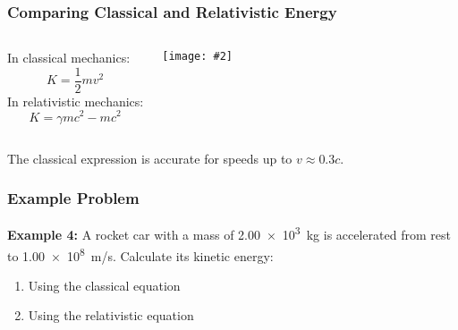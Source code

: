 \documentclass[12pt,compress,aspectratio=169]{beamer}
\newcommand{\pic}[2]{\texttt{[image: \#2]}}
\begin{document}
\begin{frame}
  \frametitle{Comparing Classical and Relativistic Energy}
  \begin{columns}
    In classical mechanics:
    {\Large
      \begin{displaymath}
        K=\frac{1}{2} mv^2
      \end{displaymath}
    }
    In relativistic mechanics:
    {\Large
      \begin{displaymath}
        K=\gamma mc^2-mc^2
      \end{displaymath}
    }
    
    \pic{.85}{graphics/e_k.png}
  \end{columns}

  The classical expression is accurate for speeds up to $v\approx 0.3c$.
\end{frame}

\begin{frame}
  \frametitle{Example Problem}
  \textbf{Example 4:} A rocket car with a mass of \SI{2.00e3}{kg} is accelerated
  from rest to \SI{1.00e8}{m/s}. Calculate its kinetic energy:
  \begin{enumerate}
  \item Using the classical equation
  \item Using the relativistic equation
  \end{enumerate}
\end{frame}
\end{document}

